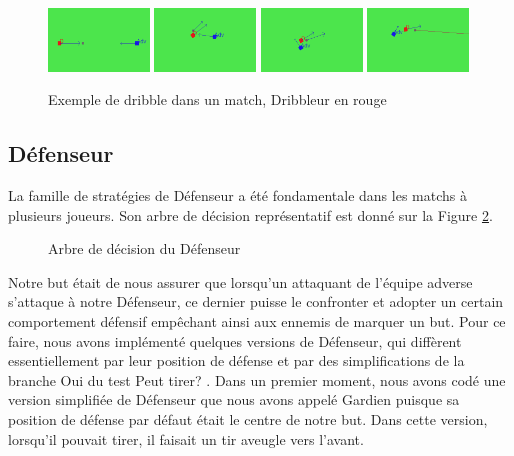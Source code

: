 \documentclass[a4paper,12pt]{article}
\begin{document}
\begin{figure}[ht]
\centering
\includegraphics[width = 0.24\textwidth]{dribble1_coupe}
\includegraphics[width = 0.24\textwidth]{dribble2_coupe}
\includegraphics[width = 0.24\textwidth]{dribble3_coupe}
\includegraphics[width = 0.24\textwidth]{dribble4_coupe}
\caption{Exemple de dribble dans un match, Dribbleur en rouge}
\label{Figure5}
\end{figure}

\subsection{Défenseur}

La famille de stratégies de Défenseur a été fondamentale dans les matchs à plusieurs joueurs. Son arbre de décision représentatif est donné sur la Figure \ref{Figure6}. 

\begin{figure}[ht]
\centering

\caption{Arbre de décision du Défenseur}
\label{Figure6}
\end{figure}

Notre but était de nous assurer que lorsqu’un attaquant de l’équipe adverse s’attaque à notre Défenseur, ce dernier puisse le confronter et adopter un certain comportement défensif empêchant ainsi aux ennemis de marquer un but. Pour ce faire, nous avons implémenté quelques versions de Défenseur, qui diffèrent essentiellement par leur position de défense et par des simplifications de la branche \og Oui \fg{} du test \og Peut tirer? \fg. Dans un premier moment, nous avons codé une version simplifiée de Défenseur que nous avons appelé Gardien puisque sa position de défense par défaut était le centre de notre but. Dans cette version, lorsqu'il pouvait tirer, il faisait un tir aveugle vers l'avant.
\end{document}

